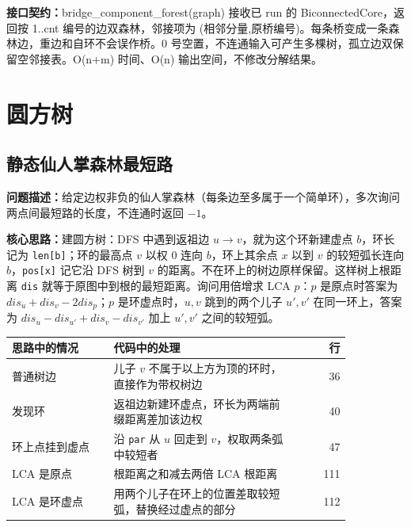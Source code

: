 {\sloppy{}\noindent\textbf{接口契约：}bridge\_component\_forest(graph) 接收已 run 的 BiconnectedCore，返回按 1..cnt 编号的边双森林，邻接项为 (相邻分量,原桥编号)。每条桥变成一条森林边，重边和自环不会误作桥。0 号空置，不连通输入可产生多棵树，孤立边双保留空邻接表。O(n+m) 时间、O(n) 输出空间，不修改分解结果。\par}



\Needspace{180pt}

\section{圆方树}

\subsection{静态仙人掌森林最短路}\label{compact-Cactus}

\noindent\textbf{问题描述：}\allowbreak 给定边权非负的仙人掌森林（每条边至多属于一个简单环），多次询问两点间最短路的长度，不连通时返回 $-1$。

\textbf{核心思路：}\allowbreak 建圆方树：DFS 中遇到返祖边 $u\to v$，就为这个环新建虚点 $b$，环长记为 \texttt{len[b]}；环的最高点 $v$ 以权 0 连向 $b$，环上其余点 $x$ 以到 $v$ 的较短弧长连向 $b$，\texttt{pos[x]} 记它沿 DFS 树到 $v$ 的距离。不在环上的树边原样保留。这样树上根距离 \texttt{dis} 就等于原图中到根的最短距离。询问用倍增求 LCA $p$：$p$ 是原点时答案为 $dis_u+dis_v-2dis_p$；$p$ 是环虚点时，$u,v$ 跳到的两个儿子 $u',v'$ 在同一环上，答案为 $dis_u-dis_{u'}+dis_v-dis_{v'}$ 加上 $u',v'$ 之间的较短弧。

\begin{center}\small
\begin{tabular}{@{}p{0.30\linewidth}p{0.55\linewidth}r@{}}
\toprule
思路中的情况 & 代码中的处理 & 行\\
\midrule
普通树边 & 儿子 $v$ 不属于以上方为顶的环时，直接作为带权树边 & 36\\
发现环 & 返祖边新建环虚点，环长为两端前缀距离差加该边权 & 40\\
环上点挂到虚点 & 沿 \texttt{par} 从 $u$ 回走到 $v$，权取两条弧中较短者 & 47\\
LCA 是原点 & 根距离之和减去两倍 LCA 根距离 & 111\\
LCA 是环虚点 & 用两个儿子在环上的位置差取较短弧，替换经过虚点的部分 & 112\\
\bottomrule
\end{tabular}
\end{center}




